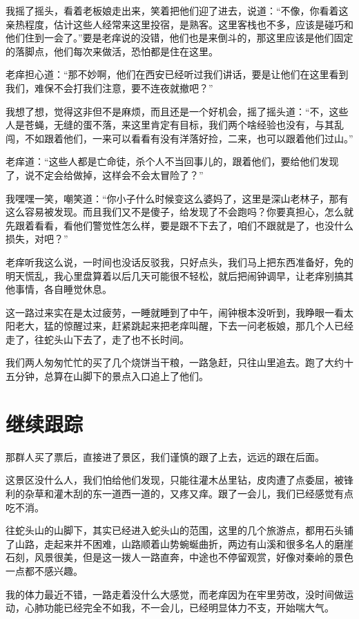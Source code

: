 我摇了摇头，看着老板娘走出来，笑着把他们迎了进去，说道：“不像，你看着这亲热程度，估计这些人经常来这里投宿，是熟客。这里客栈也不多，应该是碰巧和他们住到一会了。”要是老痒说的没错，他们也是来倒斗的，那这里应该是他们固定的落脚点，他们每次来做活，恐怕都是住在这里。

老痒担心道：“那不妙啊，他们在西安已经听过我们讲话，要是让他们在这里看到我们，难保不会打我们注意，要不连夜就撤吧？”

我想了想，觉得这非但不是麻烦，而且还是一个好机会，摇了摇头道：“不，这些人是苍蝇，无缝的蛋不落，来这里肯定有目标，我们两个啥经验也没有，与其乱闯，不如跟着他们，一来可以看看有没有洋落好捡，二来，也可以跟着他们过山。”

老痒道：“这些人都是亡命徒，杀个人不当回事儿的，跟着他们，要给他们发现了，说不定会给做掉，这样会不会太冒险了？”

我嘿嘿一笑，嘲笑道：“你小子什么时候变这么婆妈了，这里是深山老林子，那有这么容易被发现。而且我们又不是傻子，给发现了不会跑吗？你要真担心，怎么就先跟着看看，看他们警觉性怎么样，要是跟不下去了，咱们不跟就是了，也没什么损失，对吧？”

老痒听我这么说，一时间也没话反驳我，只好点头，我们马上把东西准备好，免的明天慌乱，我心里盘算着以后几天可能很不轻松，就后把闹钟调早，让老痒别搞其他事情，各自睡觉休息。

这一路过来实在是太过疲劳，一睡就睡到了中午，闹钟根本没听到，我睁眼一看太阳老大，猛的惊醒过来，赶紧跳起来把老痒叫醒，下去一问老板娘，那几个人已经走了，往蛇头山下去了，走了也不长时间。

我们两人匆匆忙忙的买了几个烧饼当干粮，一路急赶，只往山里追去。跑了大约十五分钟，总算在山脚下的景点入口追上了他们。

\chapter{继续跟踪}

那群人买了票后，直接进了景区，我们谨慎的跟了上去，远远的跟在后面。

这景区没什么人，我们怕给他们发现，只能往灌木丛里钻，皮肉遭了点委屈，被锋利的杂草和灌木刮的东一道西一道的，又疼又痒。跟了一会儿，我们已经感觉有点吃不消。

往蛇头山的山脚下，其实已经进入蛇头山的范围，这里的几个旅游点，都用石头铺了山路，走起来并不困难，山路顺着山势蜿蜒曲折，两边有山溪和很多名人的磨崖石刻，风景很美，但是这一拨人一路直奔，中途也不停留观赏，好像对秦岭的景色一点都不感兴趣。

我的体力最近不错，一路走着没什么大感觉，而老痒因为在牢里劳改，没时间做运动，心肺功能已经完全不如我，不一会儿，已经明显体力不支，开始喘大气。

